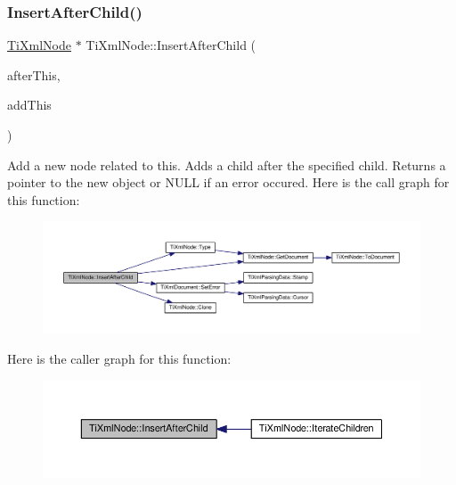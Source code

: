 \subsubsection{\texorpdfstring{Insert\+After\+Child()}{InsertAfterChild()}}
{\footnotesize\ttfamily \hyperlink{class_ti_xml_node}{Ti\+Xml\+Node} $\ast$ Ti\+Xml\+Node\+::\+Insert\+After\+Child (\begin{DoxyParamCaption}\item[{\hyperlink{class_ti_xml_node}{Ti\+Xml\+Node} $\ast$}]{after\+This,  }\item[{const \hyperlink{class_ti_xml_node}{Ti\+Xml\+Node} \&}]{add\+This }\end{DoxyParamCaption})}

Add a new node related to this. Adds a child after the specified child. Returns a pointer to the new object or N\+U\+LL if an error occured. Here is the call graph for this function\+:\nopagebreak
\begin{figure}[H]
\begin{center}
\leavevmode
\includegraphics[width=350pt]{class_ti_xml_node_a274db3292218202805c093f66a964cb5_cgraph}
\end{center}
\end{figure}
Here is the caller graph for this function\+:\nopagebreak
\begin{figure}[H]
\begin{center}
\leavevmode
\includegraphics[width=350pt]{class_ti_xml_node_a274db3292218202805c093f66a964cb5_icgraph}
\end{center}
\end{figure}
\mbox{\label{class_ti_xml_node_a71e54e393336382bc9875f64aab5cb15}} 
